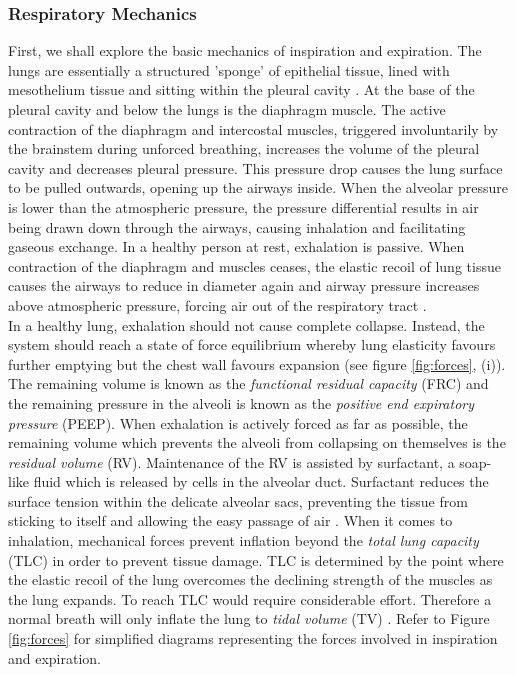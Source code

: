 \documentclass[12pt, openany, oneside]{book}
\begin{document}




\subsubsection{Respiratory Mechanics}

First, we shall explore the basic mechanics of inspiration and expiration. The lungs are essentially a structured 'sponge' of epithelial tissue, lined with mesothelium tissue and sitting within the pleural cavity \citep{hist}. At the base of the pleural cavity and below the lungs is the diaphragm muscle. The active contraction of the diaphragm and intercostal muscles, triggered involuntarily by the brainstem during unforced breathing, increases the volume of the pleural cavity and decreases pleural pressure. This pressure drop causes the lung surface to be pulled outwards, opening up the airways inside. When the alveolar pressure is lower than the atmospheric pressure, the pressure differential results in air being drawn down through the airways, causing inhalation and facilitating gaseous exchange. In a healthy person at rest, exhalation is passive. When contraction of the diaphragm and muscles ceases, the elastic recoil of lung tissue causes the airways to reduce in diameter again and airway pressure increases above atmospheric pressure, forcing air out of the respiratory tract \citep{respShade}. \\

In a healthy lung, exhalation should not cause complete collapse. Instead, the system should reach a state of force equilibrium whereby lung elasticity favours further emptying but the chest wall favours expansion (see figure \ref{fig:forces}, (i)). The remaining volume is known as the \textit{functional residual capacity} (FRC) and the remaining pressure in the alveoli is known as the \textit{positive end expiratory pressure} (PEEP). When exhalation is actively forced as far as possible, the remaining volume which prevents the alveoli from collapsing on themselves is the \textit{residual volume} (RV). Maintenance of the RV is assisted by surfactant, a soap-like fluid which is released by cells in the alveolar duct. Surfactant reduces the surface tension within the delicate alveolar sacs, preventing the tissue from sticking to itself and allowing the easy passage of air \citep{hist, respShade}.  When it comes to inhalation, mechanical forces prevent inflation beyond the \textit{total lung capacity} (TLC) in order to prevent tissue damage. TLC is determined by the point where the elastic recoil of the lung overcomes the declining strength of the muscles as the lung expands. To reach TLC would require considerable effort. Therefore a normal breath will only inflate the lung to \textit{tidal volume} (TV) \citep{respShade}. Refer to Figure \ref{fig:forces} for simplified diagrams representing the forces involved in inspiration and expiration.\\ 
\end{document}
